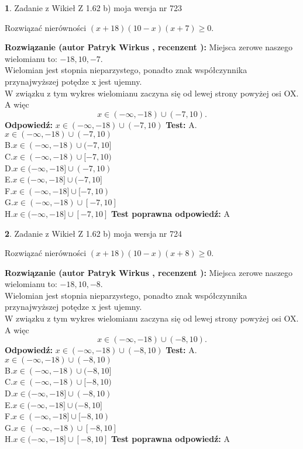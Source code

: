 \documentclass[12pt, a4paper]{article}
\theoremstyle{definition} %
\newtheorem{zad}{}
\newcommand{\zadStart}[1]{\begin{zad}#1\newline}
\newcommand{\zadStop}{\end{zad}}
\newcommand{\rozwStart}[2]{\noindent \textbf{Rozwiązanie (autor #1 , recenzent #2): }\newline}
\newcommand{\rozwStop}{\newline}
\newcommand{\odpStart}{\noindent \textbf{Odpowiedź:}\newline}
\newcommand{\odpStop}{\newline}
\newcommand{\testStart}{\noindent \textbf{Test:}\newline}
\newcommand{\testStop}{\newline}
\newcommand{\kluczStart}{\noindent \textbf{Test poprawna odpowiedź:}\newline}
\newcommand{\kluczStop}{\newline}
\begin{document}
\zadStart{Zadanie z Wikieł Z 1.62 b) moja wersja nr 723}

Rozwiązać nierówności $(x+18)(10-x)(x+7)\ge0$.
\zadStop
\rozwStart{Patryk Wirkus}{}
Miejsca zerowe naszego wielomianu to: $-18, 10, -7$.\\
Wielomian jest stopnia nieparzystego, ponadto znak współczynnika przy\linebreak najwyższej potędze x jest ujemny.\\ W związku z tym wykres wielomianu zaczyna się od lewej strony powyżej osi OX. A więc $$x \in (-\infty,-18) \cup (-7,10).$$
\rozwStop
\odpStart
$x \in (-\infty,-18) \cup (-7,10)$
\odpStop
\testStart
A.$x \in (-\infty,-18) \cup (-7,10)$\\
B.$x \in (-\infty,-18) \cup (-7,10]$\\
C.$x \in (-\infty,-18) \cup [-7,10)$\\
D.$x \in (-\infty,-18] \cup (-7,10)$\\
E.$x \in (-\infty,-18] \cup (-7,10]$\\
F.$x \in (-\infty,-18] \cup [-7,10)$\\
G.$x \in (-\infty,-18) \cup [-7,10]$\\
H.$x \in (-\infty,-18] \cup [-7,10]$
\testStop
\kluczStart
A
\kluczStop



\zadStart{Zadanie z Wikieł Z 1.62 b) moja wersja nr 724}

Rozwiązać nierówności $(x+18)(10-x)(x+8)\ge0$.
\zadStop
\rozwStart{Patryk Wirkus}{}
Miejsca zerowe naszego wielomianu to: $-18, 10, -8$.\\
Wielomian jest stopnia nieparzystego, ponadto znak współczynnika przy\linebreak najwyższej potędze x jest ujemny.\\ W związku z tym wykres wielomianu zaczyna się od lewej strony powyżej osi OX. A więc $$x \in (-\infty,-18) \cup (-8,10).$$
\rozwStop
\odpStart
$x \in (-\infty,-18) \cup (-8,10)$
\odpStop
\testStart
A.$x \in (-\infty,-18) \cup (-8,10)$\\
B.$x \in (-\infty,-18) \cup (-8,10]$\\
C.$x \in (-\infty,-18) \cup [-8,10)$\\
D.$x \in (-\infty,-18] \cup (-8,10)$\\
E.$x \in (-\infty,-18] \cup (-8,10]$\\
F.$x \in (-\infty,-18] \cup [-8,10)$\\
G.$x \in (-\infty,-18) \cup [-8,10]$\\
H.$x \in (-\infty,-18] \cup [-8,10]$
\testStop
\kluczStart
A
\kluczStop
\end{document}
